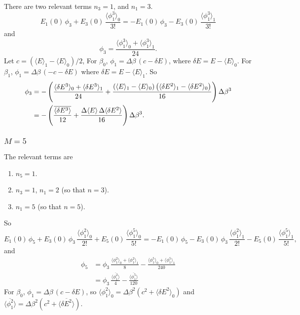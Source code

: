 \documentclass[aip,jcp,preprint,notitlepage, superscriptaddress]{revtex4-1}
\begin{document}
There are two relevant terms
$n_3 = 1$,
and $n_1 = 3$.
%
\[
E_1(0) \, \phi_3
+
E_3(0) \, \frac{ \langle \phi_1^3 \rangle_0 } { 3! }
=
-E_1(0) \, \phi_3
-
E_3(0) \, \frac{ \langle \phi_1^3 \rangle_1 }{ 3! }
\]
and
\[
\phi_3
=
\frac{
\langle \phi_1^3 \rangle_0
+
\langle \phi_1^3 \rangle_1
}{24}.
\]
%
Let
$c = \left( \langle E \rangle_1 - \langle E \rangle_0 \right) / 2$,
For $\beta_0$,
$\phi_1 = \Delta \beta \, (c - \delta E)$,
where
$\delta E = E - \langle E \rangle_0$.
%
For $\beta_1$,
$\phi_1 = \Delta \beta \, (-c -\delta E)$
where
$\delta E = E - \langle E \rangle_1$.
%
So
\begin{align*}
\phi_3
&=
-\left(
\frac{
\langle \delta E^3 \rangle_0
+
\langle \delta E^3 \rangle_1
}{24}
+
\frac{
  \left(
    \langle E \rangle_1
    -
    \langle E \rangle_0
  \right)
  \left(
    \langle \delta E^2 \rangle_1
    -
    \langle \delta E^2 \rangle_0
  \right)
}{16}
\right)
\Delta \beta^3
\notag \\
&=
-\left(
\frac{
  \overline{ \langle \delta E^3 \rangle }
}{12}
+
\frac{
  \Delta \langle E \rangle
  \,
  \Delta \langle \delta E^2 \rangle
}{16}
\right) \Delta \beta^3.
\end{align*}




\subsubsection{$M = 5$}



The relevant terms are
%
\begin{enumerate}
\item $n_5 = 1$.
\item $n_3 = 1$, $n_1 = 2$ (so that $n = 3$).
\item $n_1 = 5$ (so that $n = 5$).
\end{enumerate}
%
So
\begin{equation*}
E_1(0) \, \phi_5
+E_3(0) \, \phi_3 \, \frac{ \langle \phi_1^2 \rangle_0 } { 2! }
+E_5(0) \, \frac{ \langle \phi_1^5 \rangle_0 } { 5! }
=
-E_1(0) \, \phi_5
-E_3(0) \, \phi_3 \, \frac{ \langle \phi_1^2 \rangle_1 } { 2! }
-E_5(0) \, \frac{ \langle \phi_1^5 \rangle_1 } { 5! },
\end{equation*}
and
\begin{align*}
\phi_5
&=
\phi_3 \, \frac{ \langle \phi_1^2 \rangle_0 + \langle \phi_1^2 \rangle_1 } { 8 }
-\frac{ \langle \phi_1^5 \rangle_0 + \langle \phi_1^5 \rangle_1 } { 240 }
\\
&=
\phi_3 \, \frac{ \overline{ \langle \phi_1^2 \rangle } } { 4 }
-\frac{ \overline{ \langle \phi_1^5 \rangle } } { 120 }
\end{align*}
%
For $\beta_0$,
$\phi_1 = \Delta \beta \, (c -\delta E)$,
so
$\langle \phi_1^2 \rangle_0 = \Delta \beta^2 \left( c^2 + \langle \delta E^2 \rangle_0 \right)$
and
$\overline{ \langle \phi_1^2 \rangle } = \Delta \beta^2 \left( c^2 + \overline{ \langle \delta E^2 \rangle } \right)$.
\end{document}
